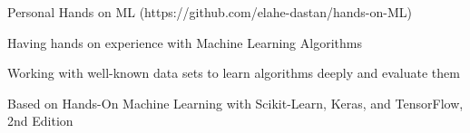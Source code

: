\begin{cventries}
    \cventry
    {Personal} %
    {Hands on ML ({\tiny https://github.com/elahe-dastan/hands-on-ML})} %
    {} %
    {} %
    {
      \begin{cvitems} %
        \item{Having hands on experience with Machine Learning Algorithms}
        \item{Working with well-known data sets to learn algorithms deeply and evaluate them}
        \item{Based on Hands-On Machine Learning with Scikit-Learn, Keras, and TensorFlow, 2nd Edition }
      \end{cvitems}
    }


\end{cventries}
